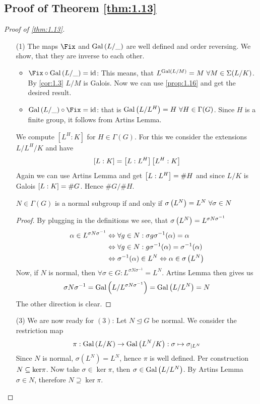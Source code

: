 \documentclass[twoside = false,	%
		headsepline,		%
		parskip = true,
		]{scrbook}						%
\begin{document}
        \subsection{Proof of Theorem \ref{thm:1.13}}
        \begin{proof}[Proof of \ref{thm:1.13}]
        \begin{enumerate}
            \item [(1)]
            The maps $\Fix$ and $\mathrm{Gal}\left( L/\_\right)$ are well defined and order reversing. We show, that they are inverse to each other.
            \begin{itemize}
                \item $\Fix\circ\Gal{L/\_}=\id$:
                This means, that $L^{\mathrm{Gal}\left( L/M\right)}=M\ \forall M\in\Sigma(L/K)$. By \ref{cor:1.3} $L/M$ is Galois. Now we can use \ref{prop:1.16} and get the desired result.
                \item $\Gal{L/\_}\circ\Fix=\id$: that is $\mathrm{Gal}\left( L/L^H\right)=H\ \forall H\in\Gamma(G)$. Since $H$ is a finite group, it follows from Artins Lemma.
            \end{itemize}
            We compute $[L^H:K]$ for $H\in\Gamma(G)$. For this we consider the extensions $L/L^H/K$ and have $$\left[ L:K\right]=\left[ L:L^H\right]\left[ L^H:K\right]$$
            Again we can use Artins Lemma and get $\left[ L:L^H\right]=\#H$ and since $L/K$ is Galois $\left[ L:K\right]=\#G$. Hence $\#G/\#H$.
            
            
            \begin{claim*}{}
            $N\in\Gamma(G)$ is a normal subgroup if and only if $\sigma\left( L^N\right)=L^N\ \forall \sigma\in N$
            \end{claim*}
            \begin{proof}
                By plugging in the definitions we see, that $\sigma\left( L^N\right)=L^{\sigma N\sigma^{-1}}$
                \begin{align*}
                    \alpha\in L^{\sigma N \sigma^{-1}} &\Leftrightarrow \forall g\in N: \sigma g \sigma^{-1}(\alpha)=\alpha \\
                    &\Leftrightarrow \forall g\in N: g\sigma^{-1}(\alpha)=\sigma^{-1}(\alpha)\\
                    &\Leftrightarrow \sigma^{-1}(\alpha)\in L^N \Leftrightarrow \alpha\in \sigma\left( L^N\right)
                \end{align*}
                Now, if $N$ is normal, then $\forall \sigma\in G: L^{\sigma N \sigma^{-1}}=L^N$. Artins Lemma then gives us $$\sigma N\sigma^{-1} = \mathrm{Gal}\left( L/L^{\sigma N \sigma^{-1}}\right) = \mathrm{Gal}\left( L/L^N\right) = N $$
                The other direction is clear.
            \end{proof}
            \item[(3)]    
            We are now ready for $(3)$: Let $N\trianglelefteq G$ be normal. We consider the restriction map
            $$\pi: \mathrm{Gal}\left( L/K\right) \to \mathrm{Gal}\left( L^N/K\right): \sigma \mapsto \sigma_{|L^N}$$
            Since $N$ is normal, $\sigma(L^N)=L^N$, hence $\pi$ is well defined. Per construction $N\subseteq \mathrm{ker}\pi$. Now take $\sigma\in \ker\pi$, then $\sigma\in\mathrm{Gal}\left( L/L^N\right)$. By Artins Lemma $\sigma\in N$, therefore $N\supseteq \ker\pi$.
            

\end{enumerate}
\end{proof}
\end{document}
